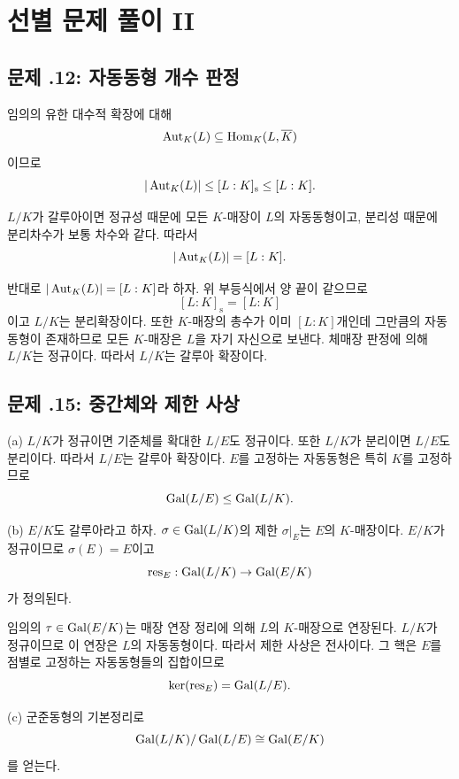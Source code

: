 \section{선별 문제 풀이 II}
\label{sec:galois-gateway-solutions-b}

\subsection*{문제 \thechapter.12: 자동동형 개수 판정}

\begin{solution}
임의의 유한 대수적 확장에 대해
\[
  \operatorname{Aut}_K(L)
  \subseteq\operatorname{Hom}_K(L,\overline K)
\]
이므로
\[
  |\operatorname{Aut}_K(L)|
  \le [L:K]_{\mathrm s}
  \le [L:K].
\]

$L/K$가 갈루아이면 정규성 때문에 모든 $K$-매장이 $L$의 자동동형이고, 분리성 때문에 분리차수가 보통 차수와 같다. 따라서
\[
  |\operatorname{Aut}_K(L)|=[L:K].
\]

반대로 $|\operatorname{Aut}_K(L)|=[L:K]$라 하자. 위 부등식에서 양 끝이 같으므로
\[
  [L:K]_{\mathrm s}=[L:K]
\]
이고 $L/K$는 분리확장이다. 또한 $K$-매장의 총수가 이미 $[L:K]$개인데 그만큼의 자동동형이 존재하므로 모든 $K$-매장은 $L$을 자기 자신으로 보낸다. 체매장 판정에 의해 $L/K$는 정규이다. 따라서 $L/K$는 갈루아 확장이다.
\end{solution}

\subsection*{문제 \thechapter.15: 중간체와 제한 사상}

\begin{solution}
(a) $L/K$가 정규이면 기준체를 확대한 $L/E$도 정규이다. 또한 $L/K$가 분리이면 $L/E$도 분리이다. 따라서 $L/E$는 갈루아 확장이다. $E$를 고정하는 자동동형은 특히 $K$를 고정하므로
\[
  \operatorname{Gal}(L/E)\le\operatorname{Gal}(L/K).
\]

(b) $E/K$도 갈루아라고 하자. $\sigma\in\operatorname{Gal}(L/K)$의 제한 $\sigma|_E$는 $E$의 $K$-매장이다. $E/K$가 정규이므로 $\sigma(E)=E$이고
\[
  \operatorname{res}_E:\operatorname{Gal}(L/K)\to\operatorname{Gal}(E/K)
\]
가 정의된다.

임의의 $\tau\in\operatorname{Gal}(E/K)$는 매장 연장 정리에 의해 $L$의 $K$-매장으로 연장된다. $L/K$가 정규이므로 이 연장은 $L$의 자동동형이다. 따라서 제한 사상은 전사이다. 그 핵은 $E$를 점별로 고정하는 자동동형들의 집합이므로
\[
  \ker(\operatorname{res}_E)=\operatorname{Gal}(L/E).
\]

(c) 군준동형의 기본정리로
\[
  \operatorname{Gal}(L/K)/\operatorname{Gal}(L/E)
  \cong\operatorname{Gal}(E/K)
\]
를 얻는다.
\end{solution}

